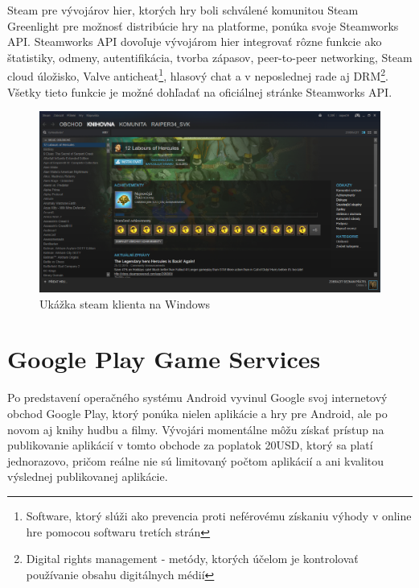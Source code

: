 Steam pre vývojárov hier, ktorých hry boli schválené komunitou Steam Greenlight pre možnosť distribúcie hry na platforme, ponúka svoje Steamworks API. Steamworks API dovoľuje vývojárom hier integrovať rôzne funkcie ako štatistiky, odmeny, autentifikácia, tvorba zápasov, peer-to-peer networking, Steam cloud úložisko, Valve anticheat\footnote{Software, ktorý slúži ako prevencia proti neférovému získaniu výhody v online hre pomocou softwaru tretích strán}, hlasový chat a v neposlednej rade aj DRM\footnote{Digital rights management - metódy, ktorých účelom je kontrolovať používanie obsahu digitálnych médií}. Všetky tieto funkcie je možné dohľadať na oficiálnej stránke Steamworks API.
\begin{figure}[h]
  \centering
  \includegraphics[scale=0.27]{fig/steam.png}
  \caption{Ukážka steam klienta na Windows}
  \label{fig:steam}
\end{figure}

\section{Google Play Game Services}
Po predstavení operačného systému Android vyvinul Google svoj internetový obchod Google Play, ktorý ponúka nielen aplikácie a hry pre Android, ale po novom aj knihy hudbu a filmy. Vývojári momentálne môžu získať prístup na publikovanie aplikácií  v tomto obchode za poplatok 20USD, ktorý sa platí jednorazovo, pričom reálne nie sú limitovaný počtom aplikácií a ani kvalitou výslednej publikovanej aplikácie.

